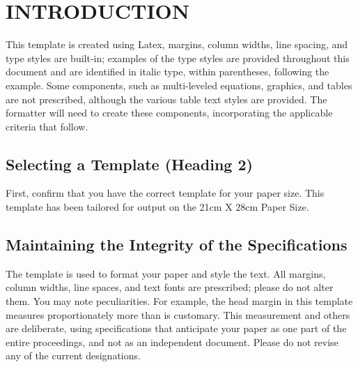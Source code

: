 
\maketitle

\section{INTRODUCTION}
\label{sec:introduction_and_overview}

This template is created using Latex, margins, column widths, line spacing, and type styles are built-in; examples of the type styles are provided throughout this document and are identified in italic type, within parentheses, following the example. Some components, such as multi-leveled equations, graphics, and tables are not prescribed, although the various table text styles are provided. The formatter will need to create these components, incorporating the applicable criteria that follow.

\setlength{\parindent}{5mm}

\label{sec:background}

\subsection{Selecting a Template (Heading 2)}
\label{subSec:cmos_power_dissipation}
First, confirm that you have the correct template for your paper size. This template has been tailored for output on the 21cm X 28cm Paper Size.

\subsection{Maintaining the Integrity of the Specifications}
\label{subSec:metrics}

The template is used to format your paper and style the text. All margins, column widths, line spaces, and text fonts are prescribed; please do not alter them. You may note peculiarities. For example, the head margin in this template measures proportionately more than is customary. This measurement and others are deliberate, using specifications that anticipate your paper as one part of the entire proceedings, and not as an independent document. Please do not revise any of the current designations.




